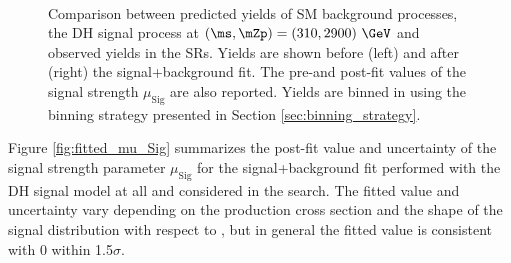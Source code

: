 \begin{figure}[h]
\begin{subfigure}{0.45\textwidth}
  \end{subfigure} \\ \vspace{1em}
  \caption[]{Comparison between predicted yields of SM background processes, the DH signal process at \((\ms, \mZp) = (310, 2900)~\GeV\) and observed yields in the SRs. Yields are shown before (left) and after (right) the signal+background fit. The pre-and post-fit values of the signal strength \(\mu_\text{Sig}\) are also reported. Yields are binned in \minms using the binning strategy presented in Section \ref{sec:binning_strategy}.}
  \label{fig:before_after_SRs_MonoSlep_monoSWWsemilep_zp2900_dm200_dh310}
\end{figure}

Figure \ref{fig:fitted_mu_Sig} summarizes the post-fit value and uncertainty of the signal strength parameter \(\mu_\text{Sig}\) for the signal+background fit performed with the DH signal model at all \ms and \mZp considered in the search. The fitted value and uncertainty vary depending on the production cross section and the shape of the signal distribution with respect to \minms, but in general the fitted value is consistent with 0 within 1.5\(\sigma\).

